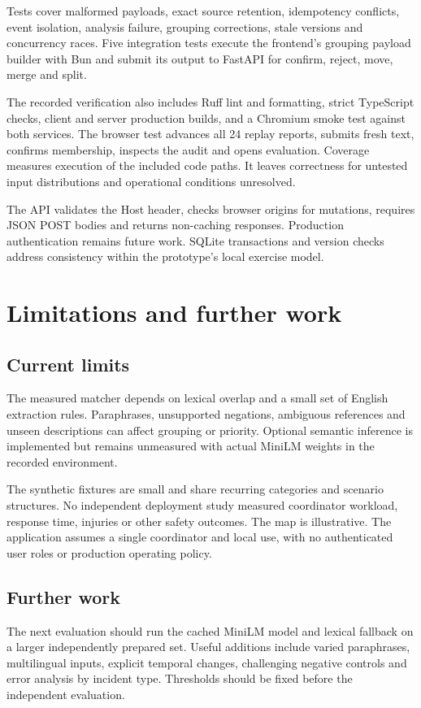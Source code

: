 \documentclass[11pt,a4paper]{article}
\begin{document}
Tests cover malformed payloads, exact source retention, idempotency conflicts, event isolation, analysis failure, grouping corrections, stale versions and concurrency races. Five integration tests execute the frontend's grouping payload builder with Bun and submit its output to FastAPI for confirm, reject, move, merge and split.

The recorded verification also includes Ruff lint and formatting, strict TypeScript checks, client and server production builds, and a Chromium smoke test against both services. The browser test advances all 24 replay reports, submits fresh text, confirms membership, inspects the audit and opens evaluation. Coverage measures execution of the included code paths. It leaves correctness for untested input distributions and operational conditions unresolved.

The API validates the Host header, checks browser origins for mutations, requires JSON POST bodies and returns non-caching responses. Production authentication remains future work. SQLite transactions and version checks address consistency within the prototype's local exercise model.

\section{Limitations and further work}
\subsection{Current limits}
The measured matcher depends on lexical overlap and a small set of English extraction rules. Paraphrases, unsupported negations, ambiguous references and unseen descriptions can affect grouping or priority. Optional semantic inference is implemented but remains unmeasured with actual MiniLM weights in the recorded environment.

The synthetic fixtures are small and share recurring categories and scenario structures. No independent deployment study measured coordinator workload, response time, injuries or other safety outcomes. The map is illustrative. The application assumes a single coordinator and local use, with no authenticated user roles or production operating policy.

\subsection{Further work}
The next evaluation should run the cached MiniLM model and lexical fallback on a larger independently prepared set. Useful additions include varied paraphrases, multilingual inputs, explicit temporal changes, challenging negative controls and error analysis by incident type. Thresholds should be fixed before the independent evaluation.
\end{document}
